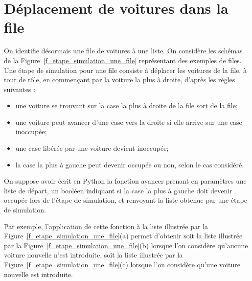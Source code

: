 


\section{Déplacement de voitures dans la file}

On identifie désormais une file de voitures à une liste. On considère les schémas de la Figure~\ref{f_etape_simulation_une_file}
représentant des exemples de files. Une étape de simulation pour une file consiste à déplacer les
voitures de la file, à tour de r\^ole, en commen\c cant par la voiture la plus à droite, d'après les règles
suivantes :

\begin{itemize}
	\item  une voiture se trouvant sur la case la plus à droite de la file sort de la file;
    \item  une voiture peut avancer d'une case vers la droite si elle arrive sur une case inoccupée;
    \item  une case libérée par une voiture devient inoccupée;
    \item la case la plus à gauche peut devenir occupée ou non, selon le cas considéré.
\end{itemize}

On suppose avoir écrit en Python la fonction avancer prenant en paramètres une liste de départ,
un booléen indiquant si la case la plus à gauche doit devenir occupée lors de l'étape de simulation,
et renvoyant la liste obtenue par une étape de simulation.


Par exemple, l'application de cette fonction à la liste illustrée par la Figure~\ref{f_etape_simulation_une_file}(a) permet d'obtenir
soit la liste illustrée par la Figure~\ref{f_etape_simulation_une_file}(b) lorsque l'on considère qu'aucune voiture nouvelle n'est
introduite, soit la liste illustrée par la Figure~\ref{f_etape_simulation_une_file}(c) lorsque l'on considère qu'une voiture nouvelle est
introduite.




